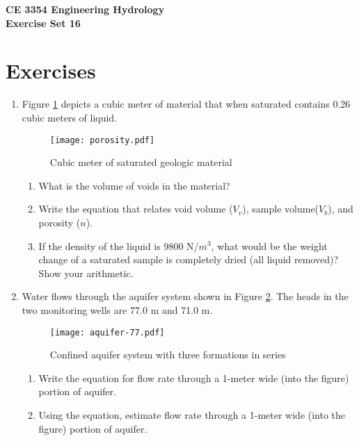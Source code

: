 \documentclass[12pt]{article}
\begin{document}
\begin{center}
{\textbf{{ CE 3354 Engineering Hydrology} \\ {Exercise Set 16}}}
\end{center}

\section*{\small{Exercises}}

\begin{enumerate}
\item Figure \ref{fig:porosity.pdf} depicts a cubic meter of material that when saturated contains 0.26 cubic meters of liquid.
\begin{figure}[h!] %
   \centering
   \texttt{[image: porosity.pdf]} 
   \caption{Cubic meter of saturated geologic material}
   \label{fig:porosity.pdf}
\end{figure}

\begin{enumerate}
\item What is the volume of voids in the material?
\item Write the equation that relates void volume ($V_v$), sample volume($V_b$), and porosity ($n$).
\item If the density of the liquid is 9800 N/$m^3$, what would be the weight change of a saturated sample is completely dried (all liquid removed)?  Show your arithmetic.
\end{enumerate}

\clearpage

\item Water flows through the aquifer system shown in Figure \ref{fig:aquifer-77.pdf}.  The heads in the two monitoring wells are 77.0 m and 71.0 m. 
\begin{figure}[h!] %
   \centering
   \texttt{[image: aquifer-77.pdf]} 
   \caption{Confined aquifer system with three formations in series}
   \label{fig:aquifer-77.pdf}
\end{figure}
\begin{enumerate}
\item Write the equation for flow rate through a 1-meter wide (into the figure) portion of aquifer.
\item Using the equation, estimate flow rate through a 1-meter wide (into the figure) portion of aquifer.
\end{enumerate}


\end{enumerate}
\end{document}
